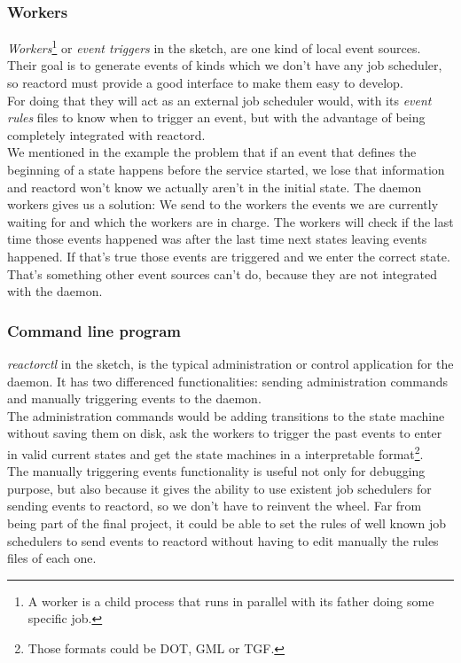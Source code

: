 \documentclass[a4paper,11pt]{article}
\begin{document}
\subsubsection{Workers}
\emph{Workers}\footnote{A worker is a child process that runs in parallel with its father doing some specific job.} 
or \emph{event triggers} in the sketch, are one kind of local event sources. Their goal is to generate events of 
kinds which we don't have any job scheduler, so reactord must provide a good interface to make them easy to 
develop.\\
For doing that they will act as an external job scheduler would, with its \emph{event rules}
files to know when to trigger an event, but with the advantage of being completely integrated with reactord.\\
We mentioned in the example the problem that if an event that defines the beginning of a state happens before the 
service started, we lose that information and reactord won't know we actually aren't in the initial state. 
The daemon workers gives us a solution: We send to the workers the events we are currently waiting for and which 
the workers are in charge. The workers will check if the last time those events happened was after the last time
next states leaving events happened. If that's true those events are triggered and we enter the correct state.
That's something other event sources can't do, because they are not integrated with the daemon.
\subsubsection{Command line program}
\label{sec:ctl}
\emph{reactorctl} in the sketch, is the typical administration or control application for the daemon. It has two 
differenced functionalities: sending administration commands and manually triggering events to the daemon.\\
The administration commands would be adding transitions to the state machine without saving them on disk, ask 
the workers to trigger the past events to enter in valid current states and get the state machines in a 
interpretable format\footnote{Those formats could be DOT, GML or TGF.}.\\
The manually triggering events functionality is useful not only for debugging purpose, but also because it gives 
the ability to use existent job schedulers for sending events to reactord, so we don't have to reinvent the wheel.
Far from being part of the final project, it could be able to set the rules of well known job schedulers to send 
events to reactord without having to edit manually the rules files of each one.
\end{document}
